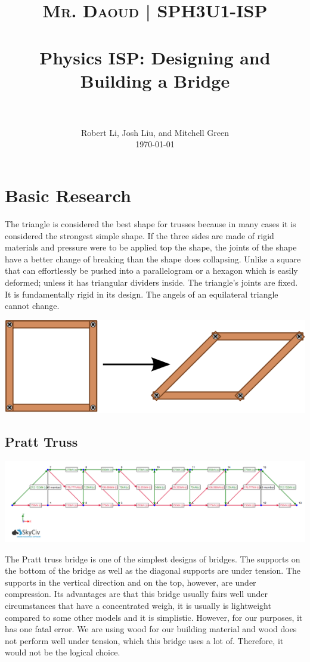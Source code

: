 \documentclass[paper=a4, fontsize=11pt]{scrartcl}
\title{
		\usefont{OT1}{bch}{b}{n}
		\normalfont \normalsize \textsc{Mr. Daoud | SPH3U1-ISP} \\ [25pt]
		\horrule{0.5pt} \\[0.4cm]
		\huge Physics ISP: Designing and Building a Bridge \\
		\horrule{2pt} \\[0.5cm]
}
\author{
		\normalfont 								\normalsize
        Robert Li, Josh Liu, and Mitchell Green\\[-3pt]		\normalsize
        \today
}
\date{}
\numberwithin{equation}{section}		%
\numberwithin{figure}{section}			%
\numberwithin{table}{section}				%
\begin{document}
\maketitle
\tableofcontents{}
\section{Basic Research}
The triangle is considered the best shape for trusses because in many cases it is considered the strongest simple shape. If the three sides are made of rigid materials and pressure were to be applied top the shape, the joints of the shape have a better change of breaking than the shape does collapsing. Unlike a square that can effortlessly be pushed into a parallelogram or a hexagon which is easily deformed; unless it has triangular dividers inside. The triangle’s joints are fixed. It is fundamentally rigid in its design. The angels of an equilateral triangle cannot change.
\begin{center}
\includegraphics{square}
\end{center}
\subsection{Pratt Truss}
\begin{center}
\includegraphics[scale=0.35]{PrattTruss}    
\end{center}

The Pratt truss bridge is one of the simplest designs of bridges. The supports on the bottom of the bridge as well as the diagonal supports are under tension. The supports in the vertical direction and on the top, however, are under compression. Its advantages are that this bridge usually fairs well under circumstances that have a concentrated weigh, it is usually is lightweight compared to some other models and it is simplistic. However, for our purposes, it has one fatal error. We are using wood for our building material and wood does not perform well under tension, which this bridge uses a lot of. Therefore, it would not be the logical choice.
\end{document}
